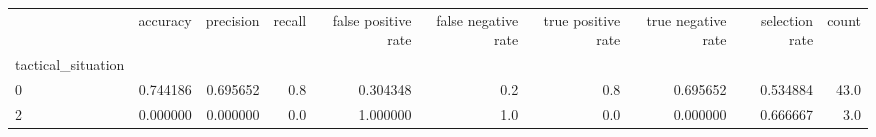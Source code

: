 \begin{tabular}{lrrrrrrrrr}
\toprule
{} &  accuracy &  precision &  recall &  false positive rate &  false negative rate &  true positive rate &  true negative rate &  selection rate &  count \\
tactical\_situation &           &            &         &                      &                      &                     &                     &                 &        \\
\midrule
0                  &  0.744186 &   0.695652 &     0.8 &             0.304348 &                  0.2 &                 0.8 &            0.695652 &        0.534884 &   43.0 \\
2                  &  0.000000 &   0.000000 &     0.0 &             1.000000 &                  1.0 &                 0.0 &            0.000000 &        0.666667 &    3.0 \\
\bottomrule
\end{tabular}
